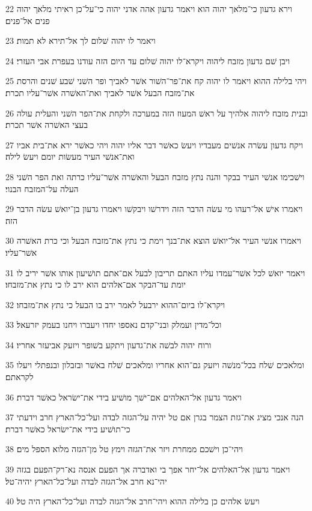 \par 22 וירא גדעון כי־מלאך יהוה הוא ויאמר גדעון אהה אדני יהוה כי־על־כן ראיתי מלאך יהוה פנים אל־פנים׃
\par 23 ויאמר לו יהוה שׁלום לך אל־תירא לא תמות׃
\par 24 ויבן שׁם גדעון מזבח ליהוה ויקרא־לו יהוה שׁלום עד היום הזה עודנו בעפרת אבי העזרי׃
\par 25 ויהי בלילה ההוא ויאמר לו יהוה קח את־פר־השׁור אשׁר לאביך ופר השׁני שׁבע שׁנים והרסת את־מזבח הבעל אשׁר לאביך ואת־האשׁרה אשׁר־עליו תכרת׃
\par 26 ובנית מזבח ליהוה אלהיך על ראשׁ המעוז הזה במערכה ולקחת את־הפר השׁני והעלית עולה בעצי האשׁרה אשׁר תכרת׃
\par 27 ויקח גדעון עשׂרה אנשׁים מעבדיו ויעשׂ כאשׁר דבר אליו יהוה ויהי כאשׁר ירא את־בית אביו ואת־אנשׁי העיר מעשׂות יומם ויעשׂ לילה׃
\par 28 וישׁכימו אנשׁי העיר בבקר והנה נתץ מזבח הבעל והאשׁרה אשׁר־עליו כרתה ואת הפר השׁני העלה על־המזבח הבנוי׃
\par 29 ויאמרו אישׁ אל־רעהו מי עשׂה הדבר הזה וידרשׁו ויבקשׁו ויאמרו גדעון בן־יואשׁ עשׂה הדבר הזה׃
\par 30 ויאמרו אנשׁי העיר אל־יואשׁ הוצא את־בנך וימת כי נתץ את־מזבח הבעל וכי כרת האשׁרה אשׁר־עליו׃
\par 31 ויאמר יואשׁ לכל אשׁר־עמדו עליו האתם תריבון לבעל אם־אתם תושׁיעון אותו אשׁר יריב לו יומת עד־הבקר אם־אלהים הוא ירב לו כי נתץ את־מזבחו׃
\par 32 ויקרא־לו ביום־ההוא ירבעל לאמר ירב בו הבעל כי נתץ את־מזבחו׃
\par 33 וכל־מדין ועמלק ובני־קדם נאספו יחדו ויעברו ויחנו בעמק יזרעאל׃
\par 34 ורוח יהוה לבשׁה את־גדעון ויתקע בשׁופר ויזעק אביעזר אחריו׃
\par 35 ומלאכים שׁלח בכל־מנשׁה ויזעק גם־הוא אחריו ומלאכים שׁלח באשׁר ובזבלון ובנפתלי ויעלו לקראתם׃
\par 36 ויאמר גדעון אל־האלהים אם־ישׁך מושׁיע בידי את־ישׂראל כאשׁר דברת׃
\par 37 הנה אנכי מציג את־גזת הצמר בגרן אם טל יהיה על־הגזה לבדה ועל־כל־הארץ חרב וידעתי כי־תושׁיע בידי את־ישׂראל כאשׁר דברת׃
\par 38 ויהי־כן וישׁכם ממחרת ויזר את־הגזה וימץ טל מן־הגזה מלוא הספל מים׃
\par 39 ויאמר גדעון אל־האלהים אל־יחר אפך בי ואדברה אך הפעם אנסה נא־רק־הפעם בגזה יהי־נא חרב אל־הגזה לבדה ועל־כל־הארץ יהיה־טל׃
\par 40 ויעשׂ אלהים כן בלילה ההוא ויהי־חרב אל־הגזה לבדה ועל־כל־הארץ היה טל׃

